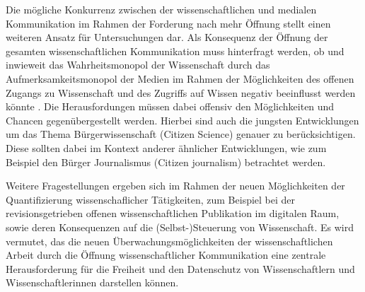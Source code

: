 Die mögliche Konkurrenz zwischen der wissenschaftlichen und medialen Kommunikation im Rahmen der Forderung nach mehr Öffnung stellt einen weiteren Ansatz für Untersuchungen dar. Als Konsequenz der Öffnung der gesamten wissenschaftlichen Kommunikation muss hinterfragt werden, ob und inwieweit das Wahrheitsmonopol der Wissenschaft durch das Aufmerksamkeitsmonopol der Medien im Rahmen der Möglichkeiten des offenen Zugangs zu Wissenschaft und des Zugriffs auf Wissen negativ beeinflusst werden könnte \cite{weingart_2005_wissenschaft}. Die Herausfordungen müssen dabei offensiv den Möglichkeiten und Chancen gegenübergestellt werden. Hierbei sind auch die jungsten Entwicklungen um das Thema Bürgerwissenschaft (Citizen Science) genauer zu berücksichtigen. Diese sollten dabei im Kontext anderer ähnlicher Entwicklungen, wie zum Beispiel den Bürger Journalismus (Citizen journalism) betrachtet werden.

Weitere Fragestellungen ergeben sich im Rahmen der neuen Möglichkeiten der Quantifizierung wissenschaflicher Tätigkeiten, zum Beispiel bei der revisionsgetrieben offenen wissenschaftlichen Publikation im digitalen Raum, sowie deren Konsequenzen auf die (Selbst-)Steuerung von Wissenschaft. Es wird vermutet, das die neuen Überwachungsmöglichkeiten der wissenschaftlichen Arbeit durch die Öffnung wissenschaftlicher Kommunikation eine zentrale Herausforderung für die Freiheit und den Datenschutz von Wissenschaftlern und Wissenschaftlerinnen darstellen können.
